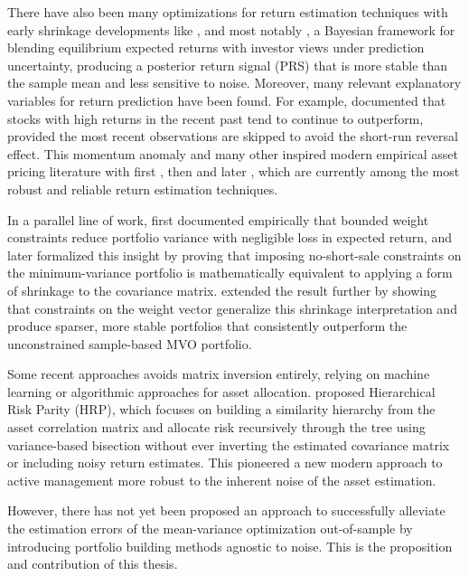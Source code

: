 \documentclass[12pt]{article}
\begin{document}
There have also been many optimizations for return estimation techniques with early shrinkage developments like \cite{stein1956}, and most notably \citet{blacklitterman1992}, a Bayesian framework for blending equilibrium expected returns with investor views under prediction uncertainty, producing a posterior return signal (PRS) that is more stable than the sample mean and less sensitive to noise. Moreover, many relevant explanatory variables for return prediction have been found. For example, \citet{jegadeesh1993} documented that stocks with high returns in the recent past tend to continue to outperform, provided the most recent observations are skipped to avoid the short-run reversal effect. This momentum anomaly and many other inspired modern empirical asset pricing literature with first \cite{famafrench1993}, then \cite{carhart1997} and later \cite{famafrench2015}, which are currently among the most robust and reliable return estimation techniques.

In a parallel line of work, \citet{frostsavarino1988} first documented empirically that bounded weight constraints reduce portfolio variance with negligible loss in expected return, and \citet{jagannathanma2003} later formalized this insight by proving that imposing no-short-sale constraints on the minimum-variance portfolio is mathematically equivalent to applying a form of shrinkage to the covariance matrix. \citet{demiguelnogales2009} extended the result further by showing that constraints on the weight vector generalize this shrinkage interpretation and produce sparser, more stable portfolios that consistently outperform the unconstrained sample-based MVO portfolio.

Some recent approaches avoids matrix inversion entirely, relying on machine learning or algorithmic approaches for asset allocation. \citet{lopezdeprado2016} proposed Hierarchical Risk Parity (HRP), which focuses on building a similarity hierarchy from the asset correlation matrix and allocate risk recursively through the tree using variance-based bisection without ever inverting the estimated covariance matrix or including noisy return estimates. This pioneered a new modern approach to active management more robust to the inherent noise of the asset estimation.

However, there has not yet been proposed an approach to successfully alleviate the estimation errors of the mean-variance optimization out-of-sample by introducing portfolio building methods agnostic to noise. This is the proposition and contribution of this thesis.
\end{document}
